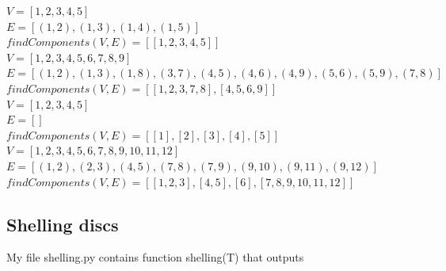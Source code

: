 \documentclass[12pt]{article}
\begin{document}
\noindent $V = [1, 2, 3, 4, 5]$ \\
$E = [(1, 2), (1, 3), (1, 4), (1, 5)]$ \\
$findComponents(V, E) = [[1, 2, 3, 4, 5]] $ \\

\noindent $V = [1, 2, 3, 4, 5, 6, 7, 8, 9] $ \\
$E = [(1, 2), (1, 3), (1, 8), (3, 7), (4, 5), (4, 6), (4, 9), (5, 6), (5, 9), (7, 8)]$ \\
$findComponents(V, E) = [[1, 2, 3, 7, 8], [4, 5, 6, 9]] $ \\

\noindent $V = [1, 2, 3, 4, 5] $ \\
$E = []$ \\
$findComponents(V, E) = [[1], [2], [3], [4], [5]] $ \\

\noindent $V = [1, 2, 3, 4, 5, 6, 7, 8, 9, 10, 11, 12] $ \\
$E = [(1, 2), (2, 3), (4, 5), (7, 8), (7, 9), (9, 10), (9, 11), (9, 12)]$ \\
$findComponents(V, E) = [[1, 2, 3], [4, 5], [6], [7, 8, 9, 10, 11, 12]] $ \\

\subsection{Shelling discs} 

My file shelling.py contains function shelling(T) that outputs 










 
    
    
    
    
    
	
	
	
	
	
	
	
	
\end{document}
